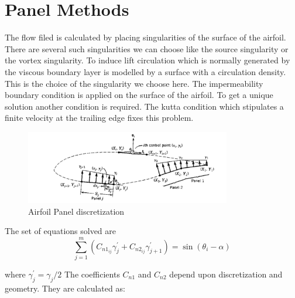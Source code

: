 \documentclass[main.tex]{subfiles}
\begin{document}
\section{Panel Methods}
The flow filed is calculated by placing singularities of the surface of the airfoil. There are several such singularities we can choose like the source singularity or the vortex singularity. To induce lift circulation which is normally generated by the viscous boundary layer is modelled by a surface with a circulation density. This is the choice of the singularity we choose here. The impermeability boundary condition is applied on the surface of the airfoil. To get a unique solution another condition is required. The kutta condition which stipulates a finite velocity at the trailing edge fixes this problem. 

\begin{figure}[h!]
\vspace*{-0.5em}\centering
\includegraphics[width=0.8\textwidth]{./Images/Assingment1/AirfoilPanel.png}
\caption{Airfoil Panel discretization}\vspace*{-0.5em}
\label{fig2}
\end{figure}\vspace*{1.0em}

The set of equations solved are 
\begin{equation}
    \sum_{j=1}^{m} (C_{n1_{ij}}\gamma^{'}_{j} + C_{n2_{ij}}\gamma^{'}_{j+1}) = \sin({\theta_i - \alpha})
\end{equation}

where $\gamma^{'}_{j} = \gamma_{j}/2$
\newline
The coefficients $C_{n1}$ and $C_{n2}$ depend upon discretization and
geometry. They are calculated as:
\end{document}
